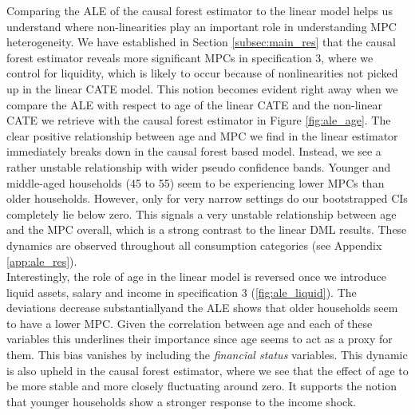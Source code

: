 Comparing the ALE of the causal forest estimator to the linear model helps us understand where non-linearities play an important role in understanding MPC heterogeneity. We have established in Section \ref{subsec:main_res} that the causal forest estimator reveals more significant MPCs in specification 3, where we control for liquidity, which is likely to occur because of nonlinearities not picked up in the linear CATE model. This notion becomes evident right away when we compare the ALE with respect to age of the linear CATE and the non-linear CATE we retrieve with the causal forest estimator in Figure \ref{fig:ale_age}. The clear positive relationship between age and MPC we find in the linear estimator immediately breaks down in the causal forest based model. Instead, we see a rather unstable relationship with wider pseudo confidence bands. Younger and middle-aged households (45 to 55) seem to be experiencing lower MPCs than older households. However, only for very narrow settings do our bootstrapped CIs completely lie below zero. This signals a very unstable relationship between age and the MPC overall, which is a strong contrast to the linear DML results. These dynamics are observed throughout all consumption categories (see Appendix \ref{app:ale_res}). \\
Interestingly, the role of age in the linear model is reversed once we introduce liquid assets, salary and income in specification 3 (\ref{fig:ale_liquid}). The deviations decrease substantiallyand the ALE shows that older households seem to have a lower MPC. Given the correlation between age and each of these variables this underlines their importance since age seems to act as a proxy for them. This bias vanishes by including the \textit{financial status} variables. This dynamic is also upheld in the causal forest estimator, where we see that the effect of age to be more stable and more closely fluctuating around zero. It supports the notion that younger households show a stronger response to the income shock. \\
